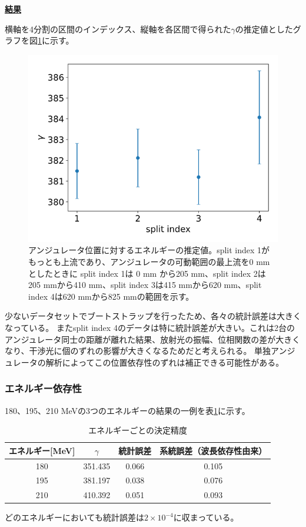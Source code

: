 \documentclass[a4paper,11pt,uplatex]{jsbook}
\begin{document}
\noindent \textbf{\underline{結果}}\par
横軸を4分割の区間のインデックス、縦軸を各区間で得られた$\gamma$の推定値としたグラフを図\ref{posdep}に示す。
\begin{figure}[h]
  \centering
  \includegraphics[width=0.8\linewidth]{image/4-posdep.png}
  \caption[アンジュレータ位置に対するエネルギーの推定値]{アンジュレータ位置に対するエネルギーの推定値。split index 1がもっとも上流であり、アンジュレータの可動範囲の最上流を0 mm としたときに
  split index 1は 0 mm から205 mm、split index 2は205 mmから410 mm、split index 3は415 mmから620 mm、split index 4は620 mmから825 mmの範囲を示す。}\label{posdep}
\end{figure}
少ないデータセットでブートストラップを行ったため、各々の統計誤差は大きくなっている。
またsplit index 4のデータは特に統計誤差が大きい。これは2台のアンジュレータ同士の距離が離れた結果、放射光の振幅、位相関数の差が大きくなり、干渉光に個のずれの影響が大きくなるためだと考えられる。
単独アンジュレータの解析によってこの位置依存性のずれは補正できる可能性がある。

\subsubsection{エネルギー依存性}
180、195、210 MeVの3つのエネルギーの結果の一例を表\ref{energy_dep}に示す。
\begin{table}[H]
\begin{tabular}{c|ccc}
  エネルギー[MeV] & $\gamma$ & 統計誤差 & 系統誤差（波長依存性由来）\\
  \hline
  180 & 351.435 & 0.066  & 0.105\\
  195 & 381.197 & 0.038 & 0.076\\
  210 & 410.392 & 0.051  & 0.093\\
\end{tabular}\caption{エネルギーごとの決定精度}\label{energy_dep}
\end{table}
どのエネルギーにおいても統計誤差は$2\times10^{-4}$に収まっている。
\end{document}
